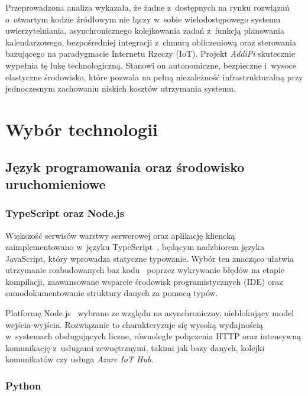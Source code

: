\documentclass[a4paper,12pt,reqno]{article}
\begin{document}
Przeprowadzona analiza wykazała, że żadne z~dostępnych na rynku rozwiązań o~otwartym kodzie źródłowym nie łączy w~sobie wielodostępowego systemu uwierzytelniania, asynchronicznego kolejkowania zadań z~funkcją planowania kalendarzowego, bezpośredniej integracji z~chmurą obliczeniową oraz sterowania bazującego na paradygmacie Internetu Rzeczy (IoT). Projekt \textit{AddiPi} skutecznie wypełnia tę lukę technologiczną. Stanowi on autonomiczne, bezpieczne i~wysoce elastyczne środowisko, które pozwala na pełną niezależność infrastrukturalną przy jednoczesnym zachowaniu niskich kosztów utrzymania systemu.


\newpage


\section{Wybór technologii}
\label{sec:technologie}

\subsection{Język programowania oraz środowisko uruchomieniowe}

\subsubsection{TypeScript oraz Node.js}

Większość serwisów warstwy serwerowej oraz aplikację kliencką zaimplementowano w~języku TypeScript~\cite{typescript}, będącym nadzbiorem języka JavaScript, który wprowadza statyczne typowanie. Wybór ten znacząco ułatwia utrzymanie rozbudowanych baz kodu~\cite{martin2022} poprzez wykrywanie błędów na etapie kompilacji, zaawansowane wsparcie środowisk programistycznych (IDE) oraz samodokumentowanie struktury danych za pomocą typów.

Platformę Node.js~\cite{nodejs} wybrano ze względu na asynchroniczny, nieblokujący model wejścia-wyjścia. Rozwiązanie to charakteryzuje się wysoką wydajnością w~systemach obsługujących liczne, równoległe połączenia HTTP oraz intensywną komunikację z~usługami zewnętrznymi, takimi jak bazy danych, kolejki komunikatów czy usługa \textit{Azure IoT Hub}.

\subsubsection{Python}
\end{document}
